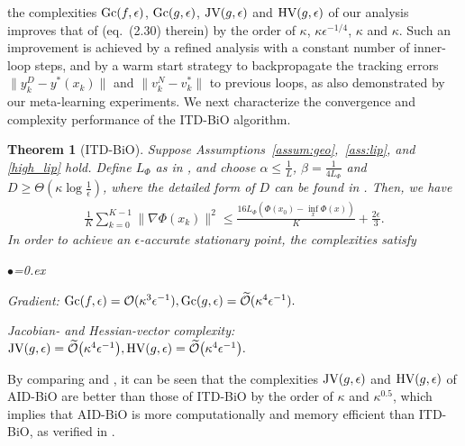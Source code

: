 \documentclass{osudissert96}
\newtheorem{theorem}{Theorem}
\begin{document}
the complexities  $\mbox{\normalfont Gc}(f,\epsilon)$, $\mbox{\normalfont Gc}(g,\epsilon)$, $\mbox{\normalfont JV}(g,\epsilon) $ and $\mbox{\normalfont HV}(g,\epsilon)$ of our analysis improves that of \cite{ghadimi2018approximation} (eq.~(2.30) therein) by the order of $\kappa$, $\kappa\epsilon^{-1/4}$, $\kappa$ and $\kappa$.  Such an improvement is achieved by a refined analysis with a constant number of inner-loop steps, and by a warm start strategy to backpropagate the tracking errors $\|y_k^D-y^*(x_k)\|$  and $\|v_k^N-v^*_k\|$ to previous loops, as also demonstrated by our meta-learning experiments.  We next characterize the convergence and complexity performance of the ITD-BiO algorithm. \begin{theorem}[ITD-BiO]\label{th:determin}
Suppose Assumptions~\ref{assum:geo},~\ref{ass:lip}, and \ref{high_lip} hold. Define $L_\Phi $ as in , and choose $\alpha\leq \frac{1}{L}$,
 $\beta=\frac{1}{4L_\Phi}$ and $D\geq \Theta(\kappa\log\frac{1}{\epsilon})$, where the detailed form of $D$ can be found in . Then, we have 
\begin{align*}
\frac{1}{K}\sum_{k=0}^{K-1}\| \nabla \Phi(x_k)\|^2 \leq \frac{16 L_\Phi (\Phi(x_0)-\inf_x\Phi(x))}{K} + \frac{2\epsilon}{3}.
\end{align*}
In order to achieve an $\epsilon$-accurate stationary point, the complexities satisfy 
\begin{list}{$\bullet$}{\topsep=0.ex \leftmargin=0.1in  \itemsep =0.01in}
\item Gradient: {\small$\mbox{\normalfont Gc}(f,\epsilon)=\mathcal{O}(\kappa^3\epsilon^{-1}), \mbox{\normalfont Gc}(g,\epsilon)=\mathcal{\widetilde O}(\kappa^4\epsilon^{-1}).$}
\item Jacobian- and Hessian-vector complexity: {\small$ \mbox{\normalfont JV}(g,\epsilon)=\mathcal{\widetilde O}\big(\kappa^4\epsilon^{-1}\big), \mbox{\normalfont HV}(g,\epsilon)=\mathcal{\widetilde O}\big(\kappa^4\epsilon^{-1}\big).$}
\end{list}
\end{theorem}
By comparing  and , it can be seen that the complexities $\mbox{\normalfont JV}(g,\epsilon)$ and $\mbox{\normalfont HV}(g,\epsilon)$  of AID-BiO are better than those of ITD-BiO by the order of  $\kappa$ and $\kappa^{0.5}$, which implies that AID-BiO is more computationally and memory efficient than ITD-BiO, as verified in .
\end{document}
